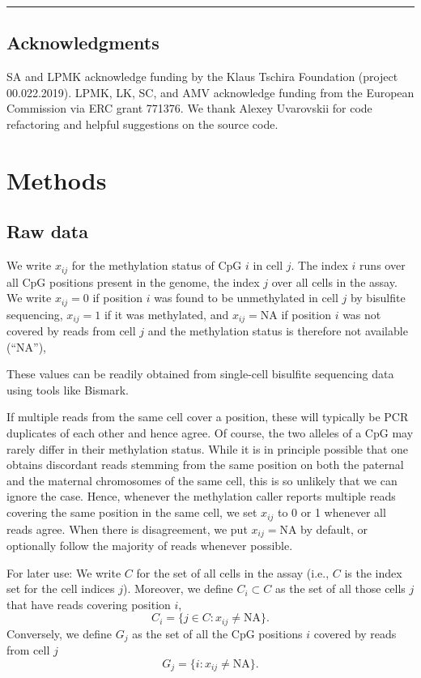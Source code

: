 \documentclass[twocolumn,10pt]{article}
\begin{document}
\vspace{1.4ex}
\noindent\hfil\rule{.6\columnwidth}{.2pt}\hfil

\subsection{Acknowledgments}

SA and LPMK acknowledge funding by the Klaus Tschira Foundation (project 00.022.2019).
LPMK, LK, SC, and AMV acknowledge funding from the European Commission via ERC grant 771376.
We thank Alexey Uvarovskii for code refactoring and helpful suggestions on the source code.
\bigskip

\section{Methods}

\subsection{Raw data}

We write $x_{ij}$ for the methylation status of CpG $i$ in cell $j$.
The index $i$ runs over all CpG positions present in the genome, the index $j$ over all cells in the assay.
We write $x_{ij}=0$ if position $i$ was found to be unmethylated in cell $j$ by bisulfite sequencing, $x_{ij}=1$ if it was methylated, and $x_{ij}=\text{NA}$ if position $i$ was not covered by reads from cell $j$ and the methylation status is therefore not available (``NA''),

These values can be readily obtained from single-cell bisulfite sequencing data using tools like Bismark.

If multiple reads from the same cell cover a position, these will typically be PCR duplicates of each other and hence agree.
Of course, the two alleles of a CpG may rarely differ in their methylation status.
While it is in principle possible that one obtains discordant reads stemming from the same position on both the paternal and the maternal chromosomes of the same cell, this is so unlikely that we can ignore the case.
Hence, whenever the methylation caller reports multiple reads covering the same position in the same cell, we set $x_{ij}$ to 0 or 1 whenever all reads agree.
When there is disagreement, we put $x_{ij}=\text{NA}$ by default, or optionally follow the majority of reads whenever possible.

For later use: We write $C$ for the set of all cells in the assay (i.e., $C$ is the index set for the cell indices $j$).
Moreover,
we define $C_i\subset C$ as the set of all those cells $j$ that have reads covering position $i$,
$$ C_i=\{j\in C: x_{ij}\neq\text{NA}\}.$$
Conversely, we define $G_j$ as the set of all the CpG positions $i$ covered by reads from cell $j$ 
$$ G_j=\{i: x_{ij}\neq\text{NA}\}.$$
\end{document}
